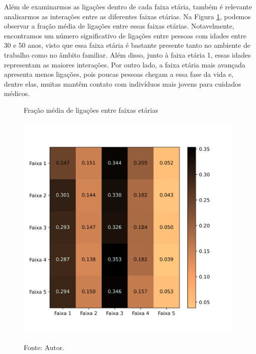 Além de examinarmos as ligações dentro de cada faixa etária, também é relevante analisarmos as interações entre as diferentes faixas etárias. Na Figura \ref{heat}, podemos observar a fração média de ligações entre essas faixas etárias. Notavelmente, encontramos um número significativo de ligações entre pessoas com idades entre 30 e 50 anos, visto que essa faixa etária é bastante presente tanto no ambiente de trabalho como no âmbito familiar. Além disso, junto à faixa etária 1, essas idades representam as maiores interações. Por outro lado, a faixa etária mais avançada apresenta menos ligações, pois poucas pessoas chegam a essa fase da vida e, dentre elas, muitas mantêm contato com indivíduos mais jovens para cuidados médicos.

\begin{figure}[H]
  \centering
  \captionsetup{font=normalsize,skip=1pt,singlelinecheck=on,labelsep=endash}

  \caption{Fração média de ligações entre faixas etárias}

  \includegraphics[scale=0.8]{./img/heat.png}

  \captionsetup{font=small,position=below,skip=-1pt}
   \caption*{\\Fonte: Autor.}
   \label{heat}
\end{figure}


